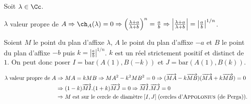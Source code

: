 {{Soit $\lambda\in\Cc$.

\begin{center}
$\lambda$ valeur propre de $A\Rightarrow \ch_A(\lambda) = 0\Rightarrow\left(\frac{\lambda+a}{\lambda+b}\right)^n=\frac{a}{b}\Rightarrow\left|\frac{\lambda+a}{\lambda+b}\right|=\left|\frac{a}{b}\right|^{1/n}$.
\end{center}

Soient $M$ le point du plan d'affixe $\lambda$, $A$ le point du plan d'affixe $-a$ et $B$ le point du plan d'affixe $-b$ puis $k =\left|\frac{a}{b}\right|^{1/n}$. $k$ est un réel strictement positif et distinct de $1$. On peut donc poser $I =\text{bar}(A(1),B(-k))$ et $J =\text{bar}(A(1),B(k))$.

\begin{align*}\ensuremath
\lambda\;\text{valeur propre de}\;A&\Rightarrow MA = kMB \Rightarrow MA^2 - k^2MB^2 = 0\Rightarrow (\overrightarrow{MA}-k\overrightarrow{MB})(\overrightarrow{MA}+k\overrightarrow{MB}) = 0\\ 
 &\Rightarrow(1-k)\overrightarrow{MI}.(1+k)\overrightarrow{MJ}= 0 \Rightarrow\overrightarrow{MI}.\overrightarrow{MJ}= 0\\
  &\Rightarrow M\;\text{est sur le cercle de diamètre}\;[I,J]\;(\text{cercles d'\textsc{Appolonius} (de Perga)}).
\end{align*}}
}